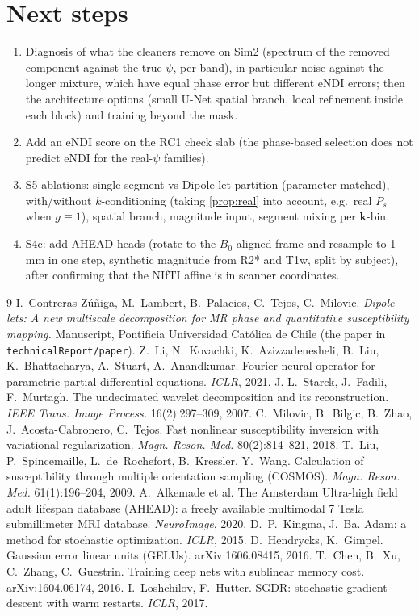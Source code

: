 \documentclass[11pt]{article}
\newcommand{\bk}{\bm{k}}
\newcommand{\code}[1]{\texttt{#1}}
\theoremstyle{remark}
\begin{document}
\section{Next steps}
\begin{enumerate}[leftmargin=1.5em,itemsep=2pt]
\item Diagnosis of what the cleaners remove on Sim2 (spectrum of the removed component against the true $\psi$, per band), in particular noise against the longer mixture, which have equal phase error but different eNDI errors; then the architecture options (small U-Net spatial branch, local refinement inside each block) and training beyond the mask.
\item Add an eNDI score on the RC1 check slab (the phase-based selection does not predict eNDI for the real-$\psi$ families).
\item S5 ablations: single segment vs Dipole-let partition (parameter-matched), with/without $k$-conditioning (taking \cref{prop:real} into account, e.g.\ real $P_s$ when $g\equiv1$), spatial branch, magnitude input, segment mixing per $\bk$-bin.
\item S4c: add AHEAD heads (rotate to the $B_0$-aligned frame and resample to 1\,mm in one step, synthetic magnitude from R2* and T1w, split by subject), after confirming that the NIfTI affine is in scanner coordinates.
\end{enumerate}

\begin{thebibliography}{9}
 I.~Contreras-Z\'u\~niga, M.~Lambert, B.~Palacios, C.~Tejos, C.~Milovic. \emph{Dipole-lets: A new multiscale decomposition for MR phase and quantitative susceptibility mapping.} Manuscript, Pontificia Universidad Cat\'olica de Chile (the paper in \code{technicalReport/paper}).
 Z.~Li, N.~Kovachki, K.~Azizzadenesheli, B.~Liu, K.~Bhattacharya, A.~Stuart, A.~Anandkumar. Fourier neural operator for parametric partial differential equations. \emph{ICLR}, 2021.
 J.-L.~Starck, J.~Fadili, F.~Murtagh. The undecimated wavelet decomposition and its reconstruction. \emph{IEEE Trans. Image Process.} 16(2):297--309, 2007.
 C.~Milovic, B.~Bilgic, B.~Zhao, J.~Acosta-Cabronero, C.~Tejos. Fast nonlinear susceptibility inversion with variational regularization. \emph{Magn. Reson. Med.} 80(2):814--821, 2018.
 T.~Liu, P.~Spincemaille, L.~de~Rochefort, B.~Kressler, Y.~Wang. Calculation of susceptibility through multiple orientation sampling (COSMOS). \emph{Magn. Reson. Med.} 61(1):196--204, 2009.
 A.~Alkemade et al. The Amsterdam Ultra-high field adult lifespan database (AHEAD): a freely available multimodal 7 Tesla submillimeter MRI database. \emph{NeuroImage}, 2020.
 D.~P.~Kingma, J.~Ba. Adam: a method for stochastic optimization. \emph{ICLR}, 2015.
 D.~Hendrycks, K.~Gimpel. Gaussian error linear units (GELUs). arXiv:1606.08415, 2016.
 T.~Chen, B.~Xu, C.~Zhang, C.~Guestrin. Training deep nets with sublinear memory cost. arXiv:1604.06174, 2016.
 I.~Loshchilov, F.~Hutter. SGDR: stochastic gradient descent with warm restarts. \emph{ICLR}, 2017.
\end{thebibliography}
\end{document}
